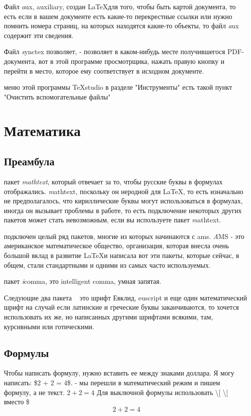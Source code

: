 \documentclass[a4paper,12pt]{article} %
\begin{document}
Файл \textit aux, auxiliary, создан \LaTeX для того, чтобы быть картой документа, то
есть если в вашем документе есть какие-то перекрестные ссылки или нужно
помнить номера страниц, на которых находятся какие-то объекты, то файл \textit aux содержит эти сведения. 

 Файл \textit synctex позволяет, - позволяет
 в каком-нибудь месте получившегося PDF-документа, вот в этой
 программе просмотрщика, нажать правую кнопку и перейти в место, которое ему
 соответствует в исходном документе. 

 меню этой программы TeXstudio в
 разделе "Инструменты" есть такой пункт "Очистить
 вспомогательные файлы"
 
\section{Математика}

\subsection{Преамбула}
 пакет \textit{mathtext}, который отвечает за то, чтобы русские буквы в формулах
 отображались. \textit mathtext, поскольку он
 неродной для \LaTeX, то есть изначально не предполагалось, что
 кириллические буквы могут использоваться в формулах, иногда он вызывает проблемы в работе, то
 есть подключение некоторых других пакетов может стать невозможным, если вы используете пакет
 \textit mathtext.
 
 подключен целый ряд пакетов,
 многие из которых начинаются с ams. \textit AMS - это американское математическое
 общество, организация, которая внесла очень большой вклад в
 развитие \LaTeX и написала вот эти пакеты, которые сейчас,
 в общем, стали стандартными и одними из
 самых часто используемых.
 
 пакет \textit icomma, это intelligent comma, умная
 запятая. 
 
 Следующие два пакета ~ это шрифт Евклид,
 euscript и еще один математический шрифт на случай если  латинские и греческие буквы заканчиваются, то
 хочется использовать их же, но написанных другими шрифтами всякими,
 там, курсивными или готическими.
\subsection{Формулы}
Чтобы написать формулу, нужно вставить ее
между знаками доллара. Я могу написать: \$2 + 2 = 4\$. - мы перешли в
математический режим и пишем формулу, а не текст. $2+2=4$
Для выключной формулы использовать \textbackslash [ \textbackslash ] вместо \$
\[2+2=4\]
\end{document}
